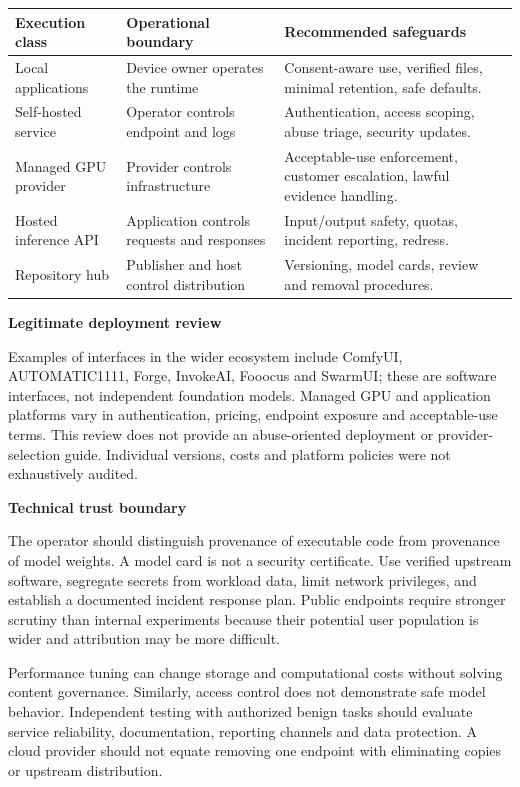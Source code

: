 \documentclass[11pt,a4paper]{article}
\newcommand{\sub}[1]{\vspace{1mm}\textbf{#1}\par}
\begin{document}
\begin{center}\small\begin{tabularx}{\linewidth}{@{}YYY@{}}\toprule
\textbf{Execution class} & \textbf{Operational boundary} & \textbf{Recommended safeguards}\\\midrule
Local applications & Device owner operates the runtime & Consent-aware use, verified files, minimal retention, safe defaults.\\
Self-hosted service & Operator controls endpoint and logs & Authentication, access scoping, abuse triage, security updates.\\
Managed GPU provider & Provider controls infrastructure & Acceptable-use enforcement, customer escalation, lawful evidence handling.\\
Hosted inference API & Application controls requests and responses & Input/output safety, quotas, incident reporting, redress.\\
Repository hub & Publisher and host control distribution & Versioning, model cards, review and removal procedures.\\\bottomrule\end{tabularx}\end{center}

\sub{Legitimate deployment review}

Examples of interfaces in the wider ecosystem include ComfyUI, AUTOMATIC1111, Forge, InvokeAI, Fooocus and SwarmUI; these are software interfaces, not independent foundation models. Managed GPU and application platforms vary in authentication, pricing, endpoint exposure and acceptable-use terms. This review does not provide an abuse-oriented deployment or provider-selection guide. Individual versions, costs and platform policies were not exhaustively audited.


\sub{Technical trust boundary}

The operator should distinguish provenance of executable code from provenance of model weights. A model card is not a security certificate. Use verified upstream software, segregate secrets from workload data, limit network privileges, and establish a documented incident response plan. Public endpoints require stronger scrutiny than internal experiments because their potential user population is wider and attribution may be more difficult.


Performance tuning can change storage and computational costs without solving content governance. Similarly, access control does not demonstrate safe model behavior. Independent testing with authorized benign tasks should evaluate service reliability, documentation, reporting channels and data protection. A cloud provider should not equate removing one endpoint with eliminating copies or upstream distribution.
\end{document}
